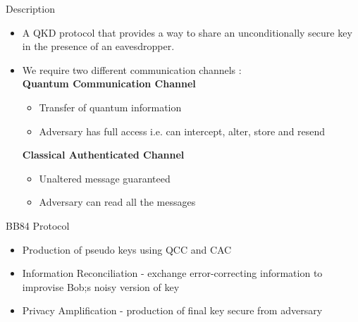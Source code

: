 \documentclass{beamer}
\begin{document}
\begin{frame}{Description}
    \begin{itemize}[<+->]
        \item A QKD protocol that provides a way to share an unconditionally secure key in the presence of an eavesdropper.\\
        \item We require two different communication channels : \\
            \textbf{Quantum Communication Channel} \\
            \begin{itemize}
                \item Transfer of quantum information
                \item Adversary has full access i.e. can intercept, alter, store and resend
            \end{itemize}
            \textbf{Classical Authenticated Channel} \\
            \begin{itemize}
                \item Unaltered message guaranteed
                \item Adversary can read all the messages
            \end{itemize}
    \end{itemize}
\end{frame}

\begin{frame}{BB84 Protocol}
    \begin{itemize}[<+->]
        \item Production of pseudo keys using QCC and CAC
        \item Information Reconciliation - exchange error-correcting information to improvise Bob;s noisy version of key
        \item Privacy Amplification -  production of final key secure from adversary  
    \end{itemize}
\end{frame}
\end{document}
